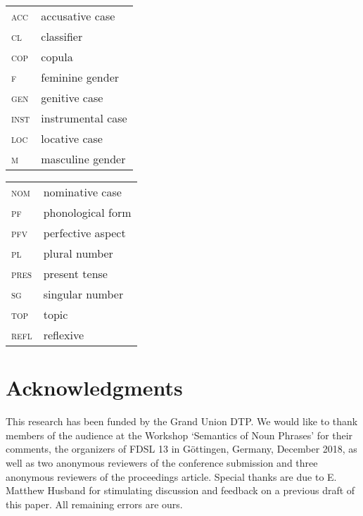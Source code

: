\documentclass[output=paper]{langscibook}
\begin{document}
\begin{tabularx}{.5\textwidth}{@{}lX@{}}
\textsc{acc}&{accusative case}\\
\textsc{cl}&{classifier}\\
\textsc{cop}&{copula}\\
\textsc{f}&{feminine gender}\\
\textsc{gen}&{genitive case}\\
\textsc{inst}&{instrumental case}\\
\textsc{loc}&{locative case}\\
\textsc{m}&{masculine gender}\\
\end{tabularx}%
\begin{tabularx}{.5\textwidth}{@{}lX@{}}
\textsc{nom}&{nominative case}\\
\textsc{\textsc{pf}}&{phonological form}\\
\textsc{pfv}&{perfective aspect}\\
\textsc{pl}&{plural number}\\
\textsc{pres}&{present tense}\\
\textsc{sg}&{singular number}\\
\textsc{top}&{topic}\\
\textsc{refl}&{reflexive}\\
\end{tabularx}

\section*{Acknowledgments}
This research has been funded by the Grand Union DTP. We would like to thank members of the audience at the Workshop `Semantics of Noun Phrases' for their comments, the organizers of FDSL 13 in Göttingen, Germany, December 2018, as well as two anonymous reviewers of the conference submission and three anonymous reviewers of the proceedings article. Special thanks are due to E. Matthew Husband for stimulating discussion and feedback on a previous draft of this paper. All remaining errors are ours.

\sloppy
\printbibliography[heading=subbibliography,notkeyword=this]
\end{document}
